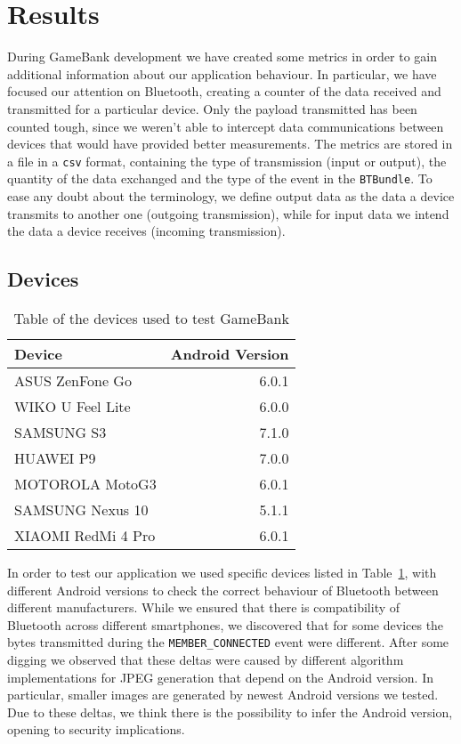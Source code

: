 \section{Results}
\label{results}

During GameBank development we have created some metrics in order to gain 
additional information about our application behaviour. In particular, we 
have focused our attention on Bluetooth, creating a counter of the data 
received and transmitted for a particular device. Only the payload transmitted 
has been counted tough, since we weren't able to intercept data communications 
between devices that would have provided better measurements. The metrics are 
stored in a file in a \texttt{csv} format, containing the type of transmission 
(input or output), the quantity of the data exchanged and the type of the 
event in the \texttt{BTBundle}. To ease any doubt about the terminology, we 
define output data as the data a device transmits to another one (outgoing 
transmission), while for input data we intend the data a device receives 
(incoming transmission).

\subsection{Devices}

\begin{table}[t]
 \centering
 \caption{Table of the devices used to test GameBank}
 \label{tab:res:lod}
 \begin{tabular}{l r}
  \textbf{Device} & \textbf{Android Version} \\ \toprule
  ASUS ZenFone Go & 6.0.1 \\
  WIKO U Feel Lite & 6.0.0 \\
  SAMSUNG S3 & 7.1.0 \\
  HUAWEI P9 & 7.0.0 \\
  MOTOROLA MotoG3 & 6.0.1 \\
  SAMSUNG Nexus 10 & 5.1.1 \\
  XIAOMI RedMi 4 Pro & 6.0.1
 \end{tabular}
\end{table}

In order to test our application we used specific devices listed in 
Table~\ref{tab:res:lod}, with different Android versions to check the correct 
behaviour of Bluetooth between different manufacturers. While we ensured that 
there is compatibility of Bluetooth across different smartphones, we discovered 
that for some devices the bytes transmitted during the 
\texttt{MEMBER\_CONNECTED} event were different. After some digging we observed 
that these deltas were caused by different algorithm implementations for JPEG 
generation that depend on the Android version. In particular, smaller images 
are generated by newest Android versions we tested. Due to these deltas, we 
think there is the possibility to infer the Android version, opening to security 
implications.

